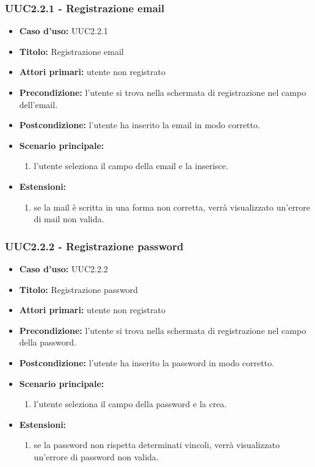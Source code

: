 \documentclass[casi-duso]{subfiles}
\begin{document}
\subsubsection{UUC2.2.1 - Registrazione email}
\label{subsub:UUC2.2.1utente}
\begin{itemize}
  \item \textbf{Caso d’uso:} UUC2.2.1 
  \item \textbf{Titolo:} Registrazione email
  \item \textbf{Attori primari:} utente non registrato
  \item \textbf{Precondizione:} l'utente si trova nella schermata di registrazione nel campo dell'email.
  \item \textbf{Postcondizione:} l'utente ha inserito la email in modo corretto. 
  \item \textbf{Scenario principale:} 
  \begin{enumerate}
    \item l'utente seleziona il campo della email e la inserisce.
  \end{enumerate}
  \item \textbf{Estensioni:} 
  \begin{enumerate}
    \item se la mail è scritta in una forma non corretta, verrà visualizzato un'errore di mail non valida.
  \end{enumerate}     
\end{itemize}

\subsubsection{UUC2.2.2 - Registrazione password}
\label{subsub:UUC2.2.2utente}
\begin{itemize}
  \item \textbf{Caso d’uso:} UUC2.2.2 
  \item \textbf{Titolo:} Registrazione password
  \item \textbf{Attori primari:} utente non registrato
  \item \textbf{Precondizione:} l'utente si trova nella schermata di registrazione nel campo della password.
  \item \textbf{Postcondizione:} l'utente ha inserito la password in modo corretto.  
  \item \textbf{Scenario principale:} 
  \begin{enumerate}
    \item l'utente seleziona il campo della password e la crea.
  \end{enumerate}
  \item \textbf{Estensioni:} 
  \begin{enumerate}
    \item se la password non rispetta determinati vincoli, verrà visualizzato un'errore di password non valida.
  \end{enumerate}     
\end{itemize}
\end{document}
